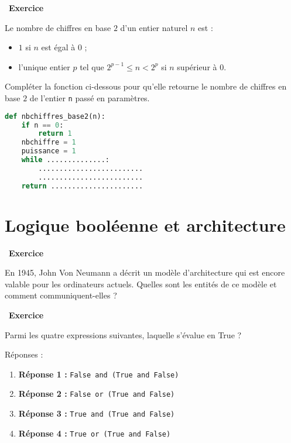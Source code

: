 \documentclass[
  11pt,
]{article}
\newcommand{\passthrough}[1]{#1}
\providecommand{\tightlist}{%
  \setlength{\itemsep}{0pt}\setlength{\parskip}{0pt}}
\newcounter{exo}
\newenvironment{exercice}[1]
{\par \medskip   \addtocounter{exo}{1} \noindent  
\begin{bclogo}[arrondi =0.1,   noborder = true, logo=\bccrayon, marge=4]{~\textbf{Exercice} \textbf{\theexo} {\itshape #1} }  \par}
{
\end{bclogo}
 \par \bigskip }
\newcounter{def}
\newcounter{logi}
\begin{document}
\begin{exercice}{}

Le nombre de chiffres en base \(2\) d'un entier naturel \(n\) est :

\begin{itemize}
\tightlist
\item
  \(1\) si \(n\) est égal à \(0\) ;
\item
  l'unique entier \(p\) tel que \(2^{p-1} \leqslant n < 2^{p}\) si \(n\)
  supérieur à \(0\).
\end{itemize}

Compléter la fonction ci-dessous pour qu'elle retourne le nombre de
chiffres en base \(2\) de l'entier \passthrough{\lstinline!n!} passé en
paramètres.

\begin{lstlisting}[language=Python]
def nbchiffres_base2(n):
    if n == 0:
        return 1
    nbchiffre = 1
    puissance = 1
    while ..............:
        .........................
        .........................
    return ......................
\end{lstlisting}

\end{exercice}

\hypertarget{logique-booluxe9enne-et-architecture}{%
\section{Logique booléenne et
architecture}\label{logique-booluxe9enne-et-architecture}}

\begin{exercice}{}

En 1945, John Von Neumann a décrit un modèle d'architecture qui est
encore valable pour les ordinateurs actuels. Quelles sont les entités de
ce modèle et comment communiquent-elles ?

\end{exercice}

\begin{exercice}{}

Parmi les quatre expressions suivantes, laquelle s'évalue en True ?

Réponses :

\begin{enumerate}
\def\labelenumi{\arabic{enumi}.}
\item
  \textbf{Réponse 1 :}
  \passthrough{\lstinline!False and (True and False)!}
\item
  \textbf{Réponse 2 :}
  \passthrough{\lstinline!False or (True and False)!}
\item
  \textbf{Réponse 3 :}
  \passthrough{\lstinline!True and (True and False)!}
\item
  \textbf{Réponse 4 :}
  \passthrough{\lstinline!True or (True and False)!}
\end{enumerate}

\end{exercice}
\end{document}
